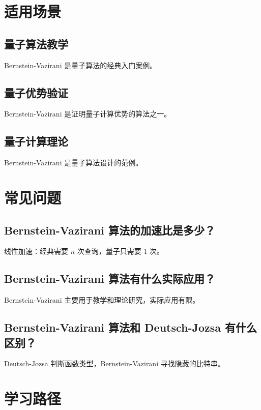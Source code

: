 \documentclass[12pt,a4paper]{article}
\begin{document}
\section{适用场景}

\subsection{量子算法教学}

Bernstein-Vazirani 是量子算法的经典入门案例。

\subsection{量子优势验证}

Bernstein-Vazirani 是证明量子计算优势的算法之一。

\subsection{量子计算理论}

Bernstein-Vazirani 是量子算法设计的范例。

\section{常见问题}

\subsection{Bernstein-Vazirani 算法的加速比是多少？}

线性加速：经典需要 $n$ 次查询，量子只需要 1 次。

\subsection{Bernstein-Vazirani 算法有什么实际应用？}

Bernstein-Vazirani 主要用于教学和理论研究，实际应用有限。

\subsection{Bernstein-Vazirani 算法和 Deutsch-Jozsa 有什么区别？}

Deutsch-Jozsa 判断函数类型，Bernstein-Vazirani 寻找隐藏的比特串。

\section{学习路径}
\end{document}

